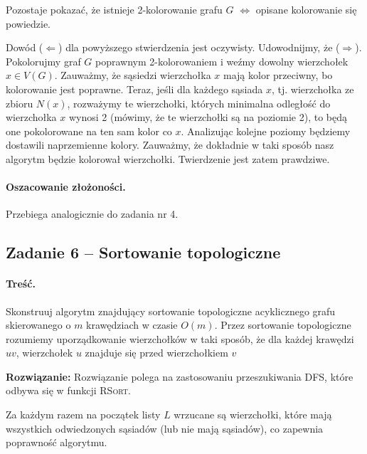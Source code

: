 Pozostaje pokazać, że istnieje 2-kolorowanie grafu $G$ $\Leftrightarrow$ opisane kolorowanie się powiedzie. 

Dowód ($\Leftarrow$) dla powyższego stwierdzenia jest oczywisty. Udowodnijmy, że ($\Rightarrow$). Pokolorujmy graf $G$
poprawnym 2-kolorowaniem i weźmy dowolny wierzchołek $x \in V(G)$. Zauważmy, że sąsiedzi
wierzchołka $x$ mają kolor przeciwny, bo kolorowanie jest poprawne. Teraz, jeśli dla każdego
sąsiada $x$, tj. wierzchołka ze zbioru $N(x)$, rozważymy te wierzchołki, których minimalna odległość do wierzchołka 
$x$ wynosi 2 (mówimy, że te wierzchołki są na poziomie 2), to będą one pokolorowane na ten sam 
kolor co $x$. Analizując kolejne poziomy
będziemy dostawili naprzemienne kolory. Zauważmy, że dokładnie w taki sposób nasz algorytm
będzie kolorował wierzchołki. Twierdzenie jest zatem prawdziwe.

\paragraph{Oszacowanie złożoności.} Przebiega analogicznie do zadania nr 4.

\subsection{Zadanie 6 -- Sortowanie topologiczne}
\label{zad:tsort}
\paragraph{Treść.} Skonstruuj algorytm znajdujący 
sortowanie topologiczne acyklicznego grafu skierowanego 
o $m$ krawędziach w czasie $O(m)$. 
Przez sortowanie topologiczne rozumiemy uporządkowanie 
wierzchołków w taki sposób, że dla
każdej krawędzi $uv$, wierzchołek $u$ znajduje się przed 
wierzchołkiem $v$

\textbf{Rozwiązanie:} Rozwiązanie polega na zastosowaniu przeszukiwania DFS, które
odbywa się w funkcji \textsc{RSort}.

Za każdym razem na początek listy $L$ wrzucane są wierzchołki, 
które mają wszystkich odwiedzonych sąsiadów (lub nie mają sąsiadów),
co zapewnia poprawność algorytmu.

